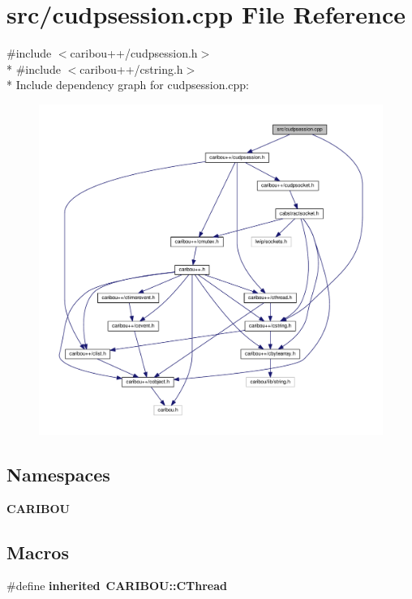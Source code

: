 \section{src/cudpsession.cpp File Reference}
\label{cudpsession_8cpp}
{\ttfamily \#include $<$caribou++/cudpsession.\+h$>$}\\*
{\ttfamily \#include $<$caribou++/cstring.\+h$>$}\\*
Include dependency graph for cudpsession.\+cpp\+:
\nopagebreak
\begin{figure}[H]
\begin{center}
\leavevmode
\includegraphics[width=350pt]{cudpsession_8cpp__incl}
\end{center}
\end{figure}
\subsection*{Namespaces}
\begin{DoxyCompactItemize}
\item 
 {\bf C\+A\+R\+I\+B\+OU}
\end{DoxyCompactItemize}
\subsection*{Macros}
\begin{DoxyCompactItemize}
\item 
\#define {\bf inherited}~{\bf C\+A\+R\+I\+B\+O\+U\+::\+C\+Thread}
\end{DoxyCompactItemize}


